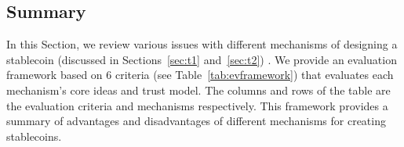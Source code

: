 
\subsection{Summary}

In this Section, we review various issues with different mechanisms of designing a stablecoin (discussed in Sections~\ref{sec:t1} and~\ref{sec:t2}) . We provide an evaluation framework based on 6 criteria (see Table~\ref{tab:evframework}) that evaluates each mechanism's core ideas and trust model. The columns and rows of the table are the evaluation criteria and mechanisms respectively. This framework provides a summary of advantages and disadvantages of different mechanisms for creating stablecoins.


